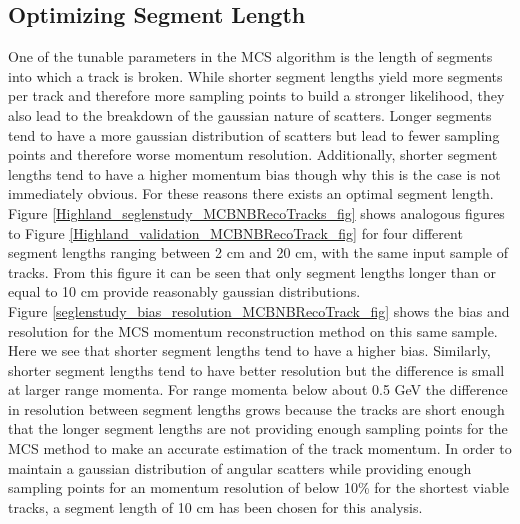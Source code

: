 \subsection{Optimizing Segment Length}\label{SegmentLength_MCBNBRecoTrack_section}
One of the tunable parameters in the MCS algorithm is the length of segments into which a track is broken. While shorter segment lengths yield more segments per track and therefore more sampling points to build a stronger likelihood, they also lead to the breakdown of the gaussian nature of scatters. Longer segments tend to have a more gaussian distribution of scatters but lead to fewer sampling points and therefore worse momentum resolution. Additionally, shorter segment lengths tend to have a higher momentum bias though why this is the case is not immediately obvious. For these reasons there exists an optimal segment length. Figure \ref{Highland_seglenstudy_MCBNBRecoTracks_fig} shows analogous figures to Figure \ref{Highland_validation_MCBNBRecoTrack_fig} for four different segment lengths ranging between 2 cm and 20 cm, with the same input sample of tracks. From this figure it can be seen that only segment lengths longer than or equal to 10 cm provide reasonably gaussian distributions.\\
Figure \ref{seglenstudy_bias_resolution_MCBNBRecoTrack_fig} shows the bias and resolution for the MCS momentum reconstruction method on this same sample. Here we see that shorter segment lengths tend to have a higher bias. Similarly, shorter segment lengths tend to have better resolution but the difference is small at larger range momenta. For range momenta below about 0.5 GeV the difference in resolution between segment lengths grows because the tracks are short enough that the longer segment lengths are not providing enough sampling points for the MCS method to make an accurate estimation of the track momentum. In order to maintain a gaussian distribution of angular scatters while providing enough sampling points for an momentum resolution of below 10\% for the shortest viable tracks, a segment length of 10 cm has been chosen for this analysis.

